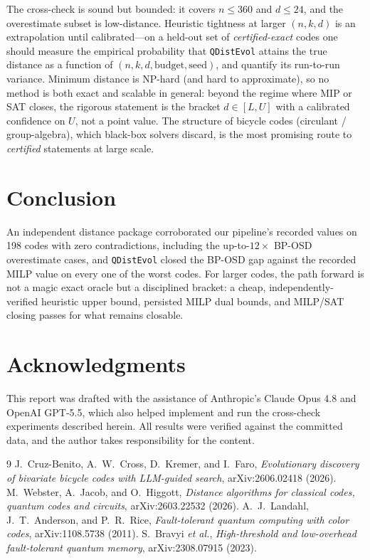 \documentclass[11pt]{article}
\begin{document}
The cross-check is sound but bounded: it covers $n\le360$ and $d\le24$, and the
overestimate subset is low-distance. Heuristic tightness at larger $(n,k,d)$ is an
extrapolation until calibrated---on a held-out set of \emph{certified-exact} codes
one should measure the empirical probability that \texttt{QDistEvol} attains the
true distance as a function of $(n,k,d,\text{budget},\text{seed})$, and quantify
its run-to-run variance. Minimum distance is NP-hard (and hard to approximate), so
no method is both exact and scalable in general: beyond the regime where MIP or SAT
closes, the rigorous statement is the bracket $d\in[L,U]$ with a calibrated
confidence on $U$, not a point value. The structure of bicycle codes (circulant /
group-algebra), which black-box solvers discard, is the most promising route to
\emph{certified} statements at large scale.

\section{Conclusion}

An independent distance package corroborated our pipeline's recorded values on
198 codes with zero contradictions, including the up-to-$12\times$ BP-OSD
overestimate cases, and \texttt{QDistEvol} closed the BP-OSD gap against the
recorded MILP value on every one of the worst codes. For larger codes, the path
forward is not a magic exact oracle but a disciplined bracket: a cheap,
independently-verified heuristic upper bound, persisted MILP dual bounds, and
MILP/SAT closing passes for what remains closable.

\section*{Acknowledgments}

This report was drafted with the assistance of Anthropic's Claude Opus 4.8 and OpenAI GPT-5.5, which 
also helped implement and run the cross-check experiments described herein. All
results were verified against the committed data, and the author takes
responsibility for the content.

\begin{thebibliography}{9}
 J.~Cruz-Benito, A.~W.~Cross, D.~Kremer, and I.~Faro,
\emph{Evolutionary discovery of bivariate bicycle codes with LLM-guided search},
arXiv:2606.02418 (2026).
 M.~Webster, A.~Jacob, and O.~Higgott,
\emph{Distance algorithms for classical codes, quantum codes and circuits},
arXiv:2603.22532 (2026).
 A.~J.~Landahl, J.~T.~Anderson, and P.~R.~Rice,
\emph{Fault-tolerant quantum computing with color codes}, arXiv:1108.5738 (2011).
 S.~Bravyi \emph{et al.},
\emph{High-threshold and low-overhead fault-tolerant quantum memory},
arXiv:2308.07915 (2023).
\end{thebibliography}
\end{document}
